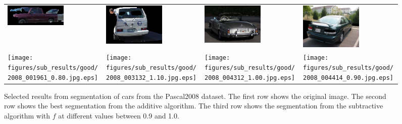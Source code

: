 \documentclass[10pt,twocolumn,letterpaper]{article}
\begin{document}
\begin{figure}[p]
\begin{tabular}{ p{3cm} p{3cm} p{3cm} p{3cm} }
\includegraphics[width=2.95cm]{figures/add_res/car/bad/2008_001961.jpg_1_bad.jpg.eps} &
\includegraphics[width=2.95cm]{figures/add_res/car/bad/2008_003132.jpg_1_bad.jpg.eps} &
\includegraphics[width=2.95cm]{figures/add_res/car/bad/2008_004312.jpg_1_bad.jpg.eps} &
\includegraphics[width=2.95cm]{figures/add_res/car/bad/2008_004414.jpg_1_bad.jpg.eps} \\

\texttt{[image: figures/sub\_results/good/2008\_001961\_0.80.jpg.eps]} &
\texttt{[image: figures/sub\_results/good/2008\_003132\_1.10.jpg.eps]} &
\texttt{[image: figures/sub\_results/good/2008\_004312\_1.00.jpg.eps]} &
\texttt{[image: figures/sub\_results/good/2008\_004414\_0.90.jpg.eps]} \\

\end{tabular}
\caption{Selected results from segmentation of cars from the Pascal2008
dataset.  The first row shows the original image.  The second row shows
the best segmentation from the additive algorithm.  The third row shows
the segmentation from the subtractive algorithm with $f$ at different values
between 0.9 and 1.0.}
\label{fig:car_bad_results}
\end{figure}
\end{document}
